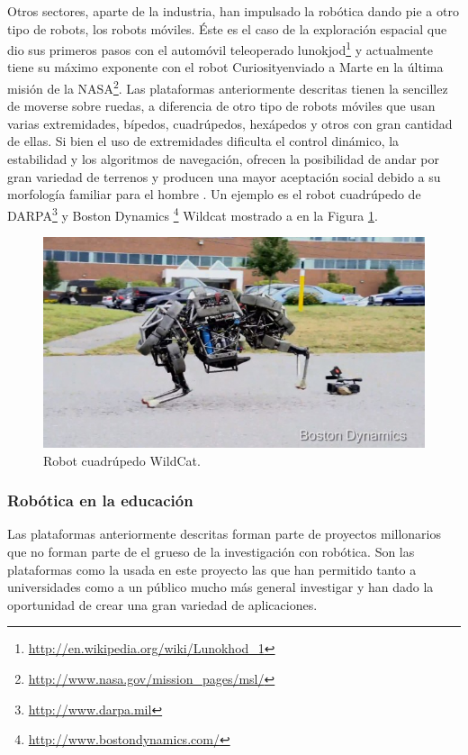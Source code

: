 \documentclass[12pt,a4paper,final,twoside]{book}
\begin{document}
Otros sectores, aparte de la industria, han impulsado la robótica dando pie a otro tipo de robots, los robots móviles. Éste es el caso de la exploración espacial que dio sus primeros pasos con el automóvil teleoperado lunokjod\footnote{\url{http://en.wikipedia.org/wiki/Lunokhod_1}} y actualmente tiene su máximo exponente con el robot Curiosityenviado a Marte en la última misión de la NASA\footnote{\url{http://www.nasa.gov/mission_pages/msl/}}. Las plataformas anteriormente descritas tienen la sencillez de moverse sobre ruedas, a diferencia de otro tipo de robots móviles que usan varias extremidades, bípedos, cuadrúpedos, hexápedos y otros con gran cantidad de ellas. Si bien el uso de extremidades dificulta el control dinámico, la estabilidad y los algoritmos de  navegación, ofrecen la posibilidad de andar por gran variedad de terrenos y producen una mayor aceptación social debido a su morfología familiar para el hombre . Un ejemplo es el robot cuadrúpedo de DARPA\footnote{\url{http://www.darpa.mil}} y Boston Dynamics \footnote{\url{http://www.bostondynamics.com/}} Wildcat mostrado a en la Figura \ref{fig:wildcat}.

\begin{figure}[h!]
	\centering
    \includegraphics[scale=0.6]	{images/Wildcat.jpg}
	 \caption{Robot cuadrúpedo WildCat.}
  \label{fig:wildcat}
\end{figure}

\subsubsection{Robótica en la educación}

Las plataformas anteriormente descritas forman parte de proyectos millonarios que no forman parte de el grueso de la investigación con robótica.
Son las plataformas como la usada en este proyecto las que han permitido tanto a universidades como a un público mucho más general investigar y han dado la oportunidad de crear una gran variedad de aplicaciones.
\end{document}
